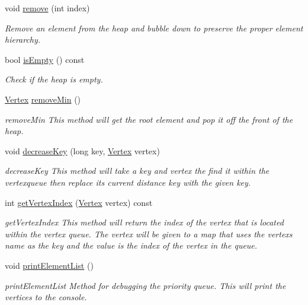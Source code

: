 \begin{DoxyCompactItemize}
void \hyperlink{class_vertex_queue_ab0e46b0a5a297f0084aff1e82b1e1da8}{remove} (int index)
\begin{DoxyCompactList}\small\item\em Remove an element from the heap and bubble down to preserve the proper element hierarchy. \end{DoxyCompactList}\item 
bool \hyperlink{class_vertex_queue_a0584988fcee5129c26abd38e97159d5e}{is\+Empty} () const 
\begin{DoxyCompactList}\small\item\em Check if the heap is empty. \end{DoxyCompactList}\item 
\hyperlink{class_vertex}{Vertex} \hyperlink{class_vertex_queue_ad51cb8fed32f22769b9e9883e8d5912e}{remove\+Min} ()
\begin{DoxyCompactList}\small\item\em remove\+Min This method will get the root element and pop it off the front of the heap. \end{DoxyCompactList}\item 
void \hyperlink{class_vertex_queue_afa16795c50529de64fd81e78a8345036}{decrease\+Key} (long key, \hyperlink{class_vertex}{Vertex} vertex)
\begin{DoxyCompactList}\small\item\em decrease\+Key This method will take a key and vertex the find it within the vertexqueue then replace its current distance key with the given key. \end{DoxyCompactList}\item 
int \hyperlink{class_vertex_queue_ae0ac2380259dfcf4629de103e484c031}{get\+Vertex\+Index} (\hyperlink{class_vertex}{Vertex} vertex) const 
\begin{DoxyCompactList}\small\item\em get\+Vertex\+Index This method will return the index of the vertex that is located within the vertex queue. The vertex will be given to a map that uses the vertex\textquotesingle{}s name as the key and the value is the index of the vertex in the queue. \end{DoxyCompactList}\item 
void \hyperlink{class_vertex_queue_acfc52ecebb057681c26dc39c55edc783}{print\+Element\+List} ()
\begin{DoxyCompactList}\small\item\em print\+Element\+List Method for debugging the priority queue. This will print the vertices to the console. \end{DoxyCompactList}\item 

\end{DoxyCompactItemize}
